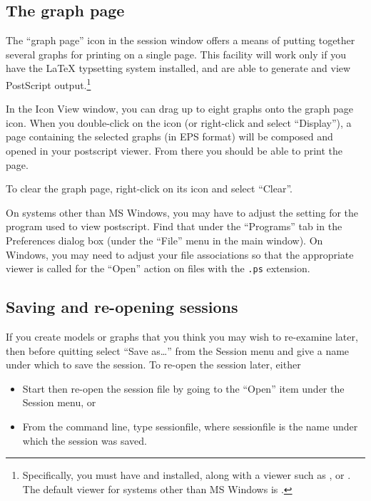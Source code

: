 \subsection{The graph page}
\label{sect-graphpage}

The ``graph page'' icon in the session window offers a means of
putting together several graphs for printing on a single page.  This
facility will work only if you have the {\LaTeX} typsetting system
installed, and are able to generate and view PostScript
output.\footnote{Specifically, you must have  and
   installed, along with a viewer such as ,
   or . The default viewer for systems other
  than MS Windows is .}  

In the Icon View window, you can drag up to eight graphs onto the
graph page icon.  When you double-click on the icon (or right-click
and select ``Display''), a page containing the selected graphs (in EPS
format) will be composed and opened in your postscript viewer.  From
there you should be able to print the page.

To clear the graph page, right-click on its icon and select ``Clear''.

On systems other than MS Windows, you may have to adjust the setting
for the program used to view postscript.  Find that under the
``Programs'' tab in the Preferences dialog box (under the ``File''
menu in the main window).  On Windows, you may need to adjust your
file associations so that the appropriate viewer is called for the
``Open'' action on files with the \verb+.ps+ extension.

\subsection{Saving and re-opening sessions}
\label{session-save}

If you create models or graphs that you think you may wish to
re-examine later, then before quitting  select ``Save
as\dots{}'' from the Session menu and give a name under which to save
the session.  To re-open the session later, either

\begin{itemize}
\item Start  then re-open the session file by going to the
  ``Open'' item under the Session menu, or
\item From the command line, type  sessionfile, where
  sessionfile is the name under which the session was saved.
\end{itemize}




